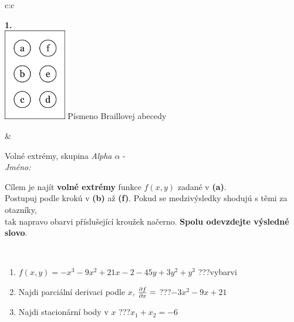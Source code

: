 \documentclass[10pt]{report}
\begin{document}
\begin{tabular}{c:c}
\begin{minipage}[c][104.5mm][t]{0.5\linewidth}
\begin{center}
\begin{minipage}{0.20\linewidth}
\begin{center}
{\Huge\bfseries 1.} \\[2mm]
\includegraphics[height=40mm]{../images/braille.png}
{\small Písmeno Braillovej abecedy}
\end{center}
\end{minipage}
\end{center}
\end{minipage}
&
\begin{minipage}[c][104.5mm][t]{0.5\linewidth}
\begin{center}
\vspace{7mm}
{\huge Volné extrémy, skupina \textit{Alpha $\alpha$} -}\\[5mm]
\textit{Jméno:}\phantom{xxxxxxxxxxxxxxxxxxxxxxxxxxxxxxxxxxxxxxxxxxxxxxxxxxxxxxxxxxxxxxxxx}\\[5mm]
\begin{minipage}{0.95\linewidth}
\begin{center}
Cílem je najít \textbf{volné extrémy} funkce $f(x,y)$ zadané v \textbf{(a)}.\\Postupuj podle krokú v \textbf{(b)} až \textbf{(f)}. Pokud se medzivýsledky shodujú s těmi za otazníky,\\tak napravo obarvi příslušející kroužek načerno. \textbf{Spolu odevzdejte výsledné slovo}.
\end{center}
\end{minipage}
\\[1mm]
\begin{minipage}{0.79\linewidth}
\begin{center}
\begin{varwidth}{\linewidth}
\begin{enumerate}
\normalsize
\item $f(x,y)=-x^3-9x^2+21x-2-45y+3y^2+y^3$\quad \dotfill\; ???\;\dotfill \quad vybarvi
\item Najdi parciální derivaci podle $x$, $\pdv{f}{x}=$\quad \dotfill\; ???\;\dotfill \quad $-3x^2-9x+21$
\item Najdi stacionární body v $x$\quad \dotfill\; ???\;\dotfill \quad $x_1+x_2=-6$

\end{enumerate}
\end{varwidth}
\end{center}
\end{minipage}
\end{center}
\end{minipage}
\end{tabular}
\end{document}
